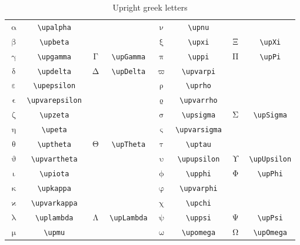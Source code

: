 \documentclass[captions=tableheading]{scrartcl}
\begin{document}
\begin{table}
  \caption{Upright greek letters}
  \label{tab:upright-greek-letters}
  \centering
  \begin{tabular}[c]{cccc@{\hskip 3em}cccc}
    \toprule
    $\upalpha$ & \verb|\upalpha| & & &
    $\upnu$ & \verb|\upnu| & & \\
    $\upbeta$ & \verb|\upbeta| & & &
    $\upxi$ & \verb|\upxi| & $\upXi$ & \verb|\upXi| \\
    $\upgamma$ & \verb|\upgamma| & $\upGamma$ & \verb|\upGamma| &
    $\uppi$ & \verb|\uppi| & $\upPi$ & \verb|\upPi| \\
    $\updelta$ & \verb|\updelta| & $\upDelta$ & \verb|\upDelta| &
    $\upvarpi$ & \verb|\upvarpi| & & \\
    $\upepsilon$ & \verb|\upepsilon| & & &
    $\uprho$ & \verb|\uprho| & & \\
    \addlinespace
    $\upvarepsilon$ & \verb|\upvarepsilon| & & &
    $\upvarrho$ & \verb|\upvarrho| & & \\
    $\upzeta$ & \verb|\upzeta| & & &
    $\upsigma$ & \verb|\upsigma| & $\upSigma$ & \verb|\upSigma| \\
    $\upeta$ & \verb|\upeta| & & &
    $\upvarsigma$ & \verb|\upvarsigma| & & \\
    $\uptheta$ & \verb|\uptheta| & $\upTheta$ & \verb|\upTheta| &
    $\uptau$ & \verb|\uptau| & & \\
    $\upvartheta$ & \verb|\upvartheta| & & &
    $\upupsilon$ & \verb|\upupsilon| & $\upUpsilon$ & \verb|\upUpsilon| \\
    \addlinespace
    $\upiota$ & \verb|\upiota| & & &
    $\upphi$ & \verb|\upphi| & $\upPhi$ & \verb|\upPhi| \\
    $\upkappa$ & \verb|\upkappa| & & &
    $\upvarphi$ & \verb|\upvarphi| & & \\
    $\upvarkappa$ & \verb|\upvarkappa| & & &
    $\upchi$ & \verb|\upchi| & & \\
    $\uplambda$ & \verb|\uplambda| & $\upLambda$ & \verb|\upLambda| &
    $\uppsi$ & \verb|\uppsi| & $\upPsi$ & \verb|\upPsi| \\
    $\upmu$ & \verb|\upmu| & & &
    $\upomega$ & \verb|\upomega| & $\upOmega$ & \verb|\upOmega| \\
    \bottomrule
  \end{tabular}
\end{table}
\end{document}

